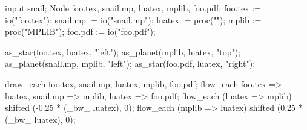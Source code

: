 \usemodule[zhfonts]
\startMPpage
input snail;
Node foo.tex, snail.mp, luatex, mplib, foo.pdf;
foo.tex := io("foo.tex");
snail.mp := io("snail.mp");
luatex := proc("\LUATEX");
mplib := proc("MPLIB");
foo.pdf := io("foo.pdf");

as_star(foo.tex, luatex, "left");
as_planet(mplib, luatex, "top");
as_planet(snail.mp, mplib, "left");
as_star(foo.pdf, luatex, "right");

draw_each foo.tex, snail.mp, luatex, mplib, foo.pdf;
flow_each foo.tex => luatex, snail.mp => mplib, luatex => foo.pdf;
flow_each (luatex => mplib) shifted (-0.25 * (_bw_ luatex), 0);
flow_each (mplib => luatex) shifted (0.25 * (_bw_ luatex), 0);
\stopMPpage
